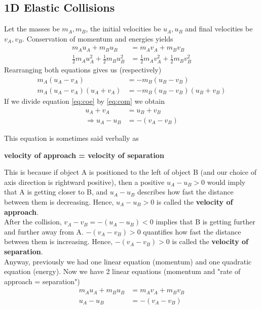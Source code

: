 \documentclass{article}
\begin{document}
\subsection{1D Elastic Collisions}
Let the masses be $m_A, m_B$, the initial velocities be $u_A, u_B$ and final velocities be $v_A, v_B$. Conservation of momentum and energies yields
\begin{align}
    m_A u_A + m_B u_B &= m_A v_A + m_B v_B \\
    \frac{1}{2} m_A u_A^2 + \frac{1}{2} m_B u_B^2 &= \frac{1}{2} m_A v_A^2 + \frac{1}{2} m_B v_B^2 
\end{align}
Rearranging both equations gives us (respectively)
\begin{align}
    m_A (u_A - v_A) &= - m_B (u_B - v_B) \label{eq:com}\\
    m_A (u_A - v_A) (u_A + v_A) &= - m_B (u_B - v_B) (u_B + v_B) \label{eq:coe}
\end{align}
If we divide equation \ref{eq:coe} by \ref{eq:com} we obtain
\begin{align}
    u_A + v_A &= u_B + v_B \\
    \Rightarrow u_A - u_B &= - (v_A - v_B)
\end{align}
\begin{samepage}
This equation is sometimes said verbally as 
\begin{center}
    \textbf{velocity of approach = velocity of separation}
\end{center}
\end{samepage}
This is because if object A is positioned to the left of object B (and our choice of axis direction is rightward positive), then a positive $u_A - u_B > 0$ would imply that A is getting closer to B, and $u_A - u_B$ describes how fast the distance between them is decreasing. Hence, $u_A - u_B > 0$ is called the \textbf{velocity of approach}. \\[10pt]
After the collision, $v_A - v_B = -(u_A - u_B) < 0$ implies that B is getting further and further away from A. $-(v_A - v_B) > 0$ quantifies how fast the distance between them is increasing. Hence, $-(v_A - v_B) > 0$ is called the \textbf{velocity of separation}.\\[10pt]
Anyway, previously we had one linear equation (momentum) and one quadratic equation (energy). Now we have 2 linear equations (momentum and "rate of approach = separation")
\begin{align}
    m_A u_A + m_B u_B &= m_A v_A + m_B v_B \label{eq:com2}\\
    u_A - u_B &= - (v_A - v_B) \label{eq:voaevos}
\end{align}
\end{document}
